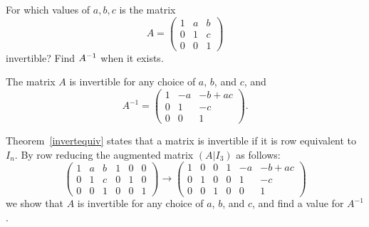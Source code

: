 \documentclass{ximera}
\begin{document}
\begin{exercise} \label{c4.9.6}
For which values of $a,b,c$ is the matrix
\[
A =\left(\begin{array}{rrr} 1 & a & b\\ 0 & 1 & c\\ 0 & 0 & 1
\end{array}\right)
\]
invertible?  Find $A^{-1}$ when it exists.

\begin{solution}

\ans
The matrix $A$ is invertible for any choice of $a$, $b$, and $c$, and
\[
A^{-1} = \left(\begin{array}{rrc} 1 & -a & -b + ac \\ 0 & 1 & -c 
\\ 0 & 0 & 1 \end{array}\right).
\]

\soln Theorem~\ref{invertequiv} states that a matrix is invertible if
it is row equivalent to $I_n$.  By row reducing the augmented matrix
$(A|I_3)$ as follows:
\[
\left(\begin{array}{rrr|rrr} 1 & a & b & 1 & 0 & 0 \\
0 & 1 & c & 0 & 1 & 0 \\ 0 & 0 & 1 & 0 & 0 & 1
\end{array}\right) \rightarrow \left(\begin{array}{rrr|rrc}
1 & 0 & 0 & 1 & -a & -b + ac \\ 0 & 1 & 0 & 0 & 1 & -c \\
0 & 0 & 1 & 0 & 0 & 1 \end{array}\right)
\]
we show that $A$ is invertible for any choice of $a$, $b$, and
$c$, and find a value for $A^{-1}$.

\end{solution}
\end{exercise}
\end{document}
